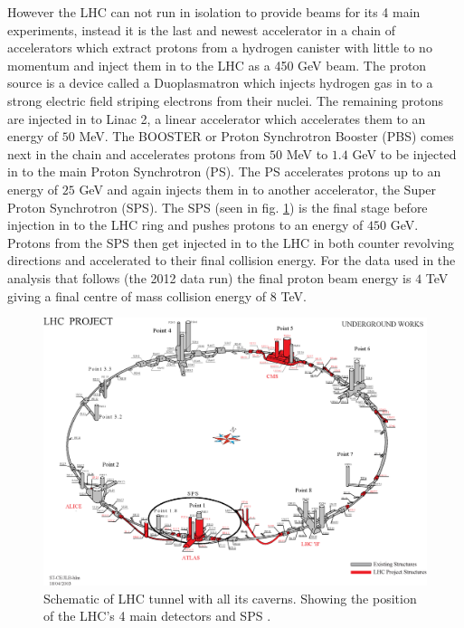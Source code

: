	However the LHC can not run in isolation to provide beams for its 4 main experiments, instead it is the last and newest accelerator in a chain of accelerators which extract protons from a hydrogen canister with little to no momentum and inject them in to the LHC as a 450 GeV beam.
	The proton source is a device called a Duoplasmatron which injects hydrogen gas in to a strong electric field striping electrons from their nuclei. The remaining protons are injected in to Linac 2, a linear accelerator which accelerates them to an energy of $50$ MeV. The BOOSTER or Proton Synchrotron Booster (PBS) comes next in the chain and accelerates protons from $50$ MeV to $1.4$ GeV to be injected in to the main Proton Synchrotron (PS). The PS accelerates protons up to an energy of $25$ GeV and again injects them in to another accelerator, the Super Proton Synchrotron (SPS). The SPS (seen in fig. \ref{fig:experimentLHC}) is the final stage before injection in to the LHC ring and pushes protons to an energy of $450$ GeV. Protons from the SPS then get injected in to the LHC in both counter revolving directions and accelerated to their final collision energy. For the data used in the analysis that follows (the 2012 data run) the final proton beam energy is $4$ TeV giving a final centre of mass collision energy of $8$ TeV.

	\begin{figure}[h]
        \begin{center}
            \includegraphics[scale=0.6]{images/LHCUnder.eps}
        \end{center}
        \caption{Schematic of LHC tunnel with all its caverns. Showing the position of the LHC's 4 main detectors and SPS \cite{1367-2630-9-9-335}.}
        \label{fig:experimentLHC}
    \end{figure}

